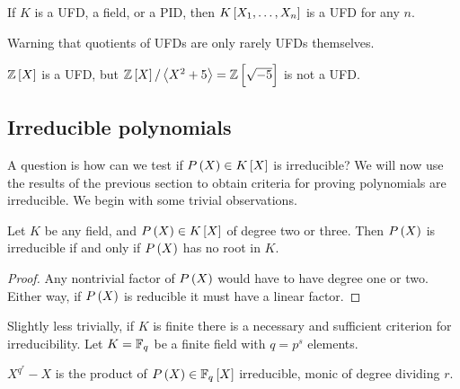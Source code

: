 \begin{corollary}
If $ K $ is a UFD, a field, or a PID, then $ K\sbr{X_1, \dots, X_n} $ is a UFD for any $ n $.
\end{corollary}

Warning that quotients of UFDs are only rarely UFDs themselves.

\begin{example*}
$ \Z\sbr{X} $ is a UFD, but $ \Z\sbr{X} / \abr{X^2 + 5} = \Z\sbr{\sqrt{-5}} $ is not a UFD.
\end{example*}

\pagebreak

\subsection{Irreducible polynomials}


A question is how can we test if $ P\br{X} \in K\sbr{X} $ is irreducible? We will now use the results of the previous section to obtain criteria for proving polynomials are irreducible. We begin with some trivial observations.

\begin{lemma}
Let $ K $ be any field, and $ P\br{X} \in K\sbr{X} $ of degree two or three. Then $ P\br{X} $ is irreducible if and only if $ P\br{X} $ has no root in $ K $.
\end{lemma}

\begin{proof}
Any nontrivial factor of $ P\br{X} $ would have to have degree one or two. Either way, if $ P\br{X} $ is reducible it must have a linear factor.
\end{proof}

Slightly less trivially, if $ K $ is finite there is a necessary and sufficient
criterion for irreducibility. Let $ K = \mathbb{F}_q $ be a finite field with $ q = p^s $ elements.

\begin{lemma}
$ X^{q^r} - X $ is the product of $ P\br{X} \in \F_q\sbr{X} $ irreducible, monic of degree dividing $ r $.
\end{lemma}

